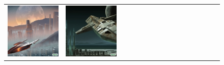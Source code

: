 \begin{figure}[ht!]
\begin{adjustwidth}{-0.8in}{-0.5in}
\begin{tabular}{cccccccccccccccccccc}
\multicolumn{3}{c}{\includegraphics[width=\twobytwocolwidth\textwidth]{figures/cherries/spaceship1.jpg}} &
\multicolumn{3}{c}{\includegraphics[width=\twobytwocolwidth\textwidth]{figures/cherries/spaceship2.jpg}} &&

\end{tabular}
\end{adjustwidth}
\end{figure}
